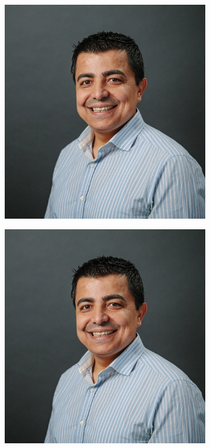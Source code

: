 \begin{figure}[h]
\begin{center}
\begin{subfigure}{0.3\textwidth}
  \caption{}
 \end{subfigure}
 \begin{subfigure}{0.3\textwidth}
  \includegraphics[width=0.99\textwidth]{figures/cover/ali.jpg}
  \caption{}
 \end{subfigure}
 \begin{subfigure}{0.3\textwidth}
  \includegraphics[width=0.99\textwidth]{figures/cover/ali.jpg}

\end{subfigure}
\end{center}
\end{figure}
